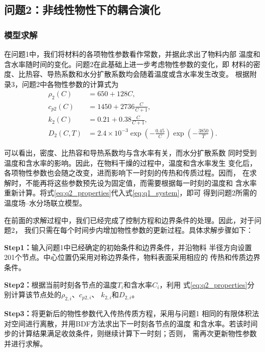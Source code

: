 \subsection{问题2：非线性物性下的耦合演化}

\subsubsection{模型求解}

在问题1中，我们将材料的各项物性参数看作常数，并据此求出了物料内部
温度和含水率随时间的变化。问题2在此基础上进一步考虑物性参数的变化，即
材料的密度、比热容、导热系数和水分扩散系数均会随着温度或含水率发生改变。
根据附录3，问题2中各物性参数的计算式为
\begin{equation}
\begin{aligned}
\rho_2(C)
&=650+128C,\\
c_{p2}(C)
&=1450+2736\frac{C}{C+1},\\
k_2(C)
&=0.21+0.38\frac{C}{C+1},\\
D_2(C,T)
&=2.4\times10^{-3}
\exp\!\left(-\frac{0.45}{C}\right)
\exp\!\left(-\frac{3850}{T}\right).
\end{aligned}
\label{eq:q2_properties}
\end{equation}

可以看出，密度、比热容和导热系数均与含水率有关，而水分扩散系数
同时受到温度和含水率的影响。因此，在物料干燥的过程中，温度和含水率发生
变化后，各项物性参数也会随之改变，进而影响下一时刻的传热和传质过程。因而，
在求解时，不能再将这些参数预先设为固定值，而需要根据每一时刻的温度和
含水率重新计算。将式\eqref{eq:q2_properties}代入式\eqref{eq:q1_system}，即可
得到问题2所需的温度场--水分场联立模型。

在前面的求解过程中，我们已经完成了控制方程和边界条件的处理。因此，对于问题2，
我们只需在每个时间步内增加物性参数的更新过程。具体求解步骤如下：

\noindent\textbf{Step1：}输入问题1中已经确定的初始条件和边界条件，并沿物料
半径方向设置201个节点。中心位置仍采用对称边界条件，物料表面采用相应的
传热和传质边界条件。

\noindent\textbf{Step2：}根据当前时刻各节点的温度$T_i$和含水率$C_i$，利用
式\eqref{eq:q2_properties}分别计算该节点处的$\rho_{2,i}$、$c_{p2,i}$、
$k_{2,i}$和$D_{2,i}$。

\noindent\textbf{Step3：}将更新后的物性参数代入传热传质方程，采用与问题1
相同的有限体积法对空间进行离散，并用BDF方法求出下一时刻各节点的温度
和含水率。若该时间步的计算结果满足收敛条件，则继续计算下一时刻；否则，
需再次更新物性参数并进行求解。

